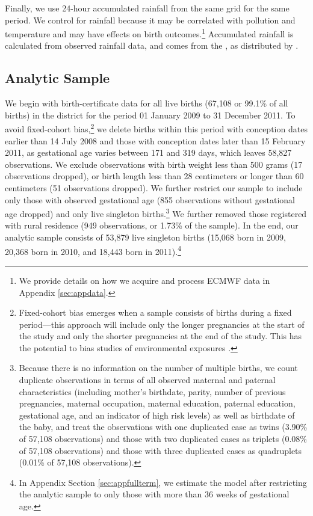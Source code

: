 Finally, we use 24-hour accumulated rainfall from the same grid for the same period. We control for rainfall because it may be correlated with pollution and temperature and may have effects on birth outcomes.\footnote{We provide details on how we acquire and process ECMWF data in Appendix \ref{sec:appdata}.}
Accumulated rainfall is calculated from observed rainfall
data, and comes from the  \textcite{national_oceanic_and_atmospheric_administration_global_2020}, as distributed by \textcite{raspisaniye_pogodi_ltd_weather_2020}.

\subsection{Analytic Sample\label{analytic-sample}}

We begin with birth-certificate data for all live births (67,108 or
99.1\% of all births) in the district for the period 01 January 2009 to
31 December 2011. To avoid fixed-cohort bias,\footnote{Fixed-cohort bias
  emerges when a sample consists of births during a fixed period---this
  approach will include only the longer pregnancies at the start of the
  study and only the shorter pregnancies at the end of the study. This
  has the potential to bias studies of environmental exposures \autocite{strand_methodological_2011}.} we delete
births within this period with conception dates earlier than 14 July
2008 and those with conception dates later than 15 February 2011, as
gestational age varies between 171 and 319 days, which leaves 58,827
observations. We exclude observations with birth weight less than 500 grams (17 observations dropped), or birth length less than 28 centimeters or longer than 60 centimeters (51 observations dropped). We further restrict our sample to
include only those with observed gestational age (855 observations
without gestational age dropped) and only live singleton
births.\footnote{Because there is no information on the number of
  multiple births, we count duplicate observations in terms of all
  observed maternal and paternal characteristics (including mother's
  birthdate, parity, number of previous pregnancies, maternal occupation, maternal education, paternal
  education, gestational age, and an indicator of high risk levels) as well as
  birthdate of the baby, and treat the observations with one duplicated
  case as twins (3.90\% of 57,108 observations) and those with two
  duplicated cases as triplets (0.08\% of 57,108 observations) and those
  with three duplicated cases as quadruplets (0.01\% of 57,108
  observations).} We further removed those registered with rural residence (949 observations, or 1.73\% of the sample). In the end, our analytic sample consists of 53,879 live
singleton births (15,068 born in 2009, 20,368 born in 2010, and 18,443
born in 2011).\footnote{In Appendix Section \ref{sec:appfullterm}, we estimate the model after restricting the analytic sample to only those with more than 36 weeks of gestational age.}

